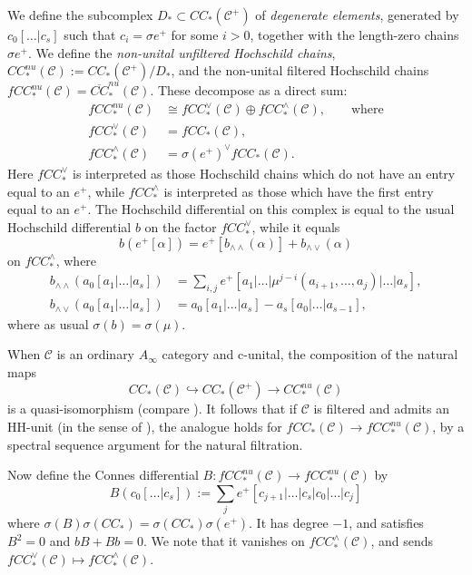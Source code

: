 \documentclass{article}
\def\cC{\mathcal{C}}
\begin{document}
We define the subcomplex $D_* \subset CC_*(\cC^+)$ of \emph{degenerate elements}, generated by $c_0[\ldots|c_s]$ such that $c_i = \sigma e^+$ for some $i>0$, together with the length-zero chains $\sigma e^+$. 
We define the \emph{non-unital unfiltered Hochschild chains}, $CC_*^{nu}(\cC) := CC_*(\cC^+)/D_*$, and the non-unital filtered Hochschild chains $fCC^{nu}_*(\cC) = \overline{CC}_*^{nu}(\cC)$. 
These decompose as a direct sum:
\begin{align*}
    fCC^{nu}_*(\cC) &\cong fCC^\vee_*(\cC) \oplus fCC^\wedge_*(\cC),\qquad\text{where}\\
    fCC^{\vee}_*(\cC) &= fCC_*(\cC),\\
    fCC^{\wedge}_*(\cC) &= \sigma(e^+)^\vee fCC_*(\cC).
\end{align*}
Here $fCC^{\vee}_*$ is interpreted as those Hochschild chains which do not have an entry equal to an $e^+$, while $fCC^{\wedge}_*$ is interpreted as those which have the first entry equal to an $e^+$. 
The Hochschild differential on this complex is equal to the usual Hochschild differential $b$ on the factor $fCC^{\vee}_*$, while it equals
$$b(e^+[\alpha]) = e^+[b_{\wedge\wedge}(\alpha)] + b_{\wedge \vee}(\alpha)$$
on $fCC^{\wedge}_*$, where
\begin{align}
\label{eq:b hat}
    b_{\wedge \wedge}(a_0[a_1|\ldots|a_s]) &=  \sum_{i,j} e^+[a_1|\ldots|\mu^{j-i}(a_{i+1},\ldots,a_j)|\ldots|a_s],\\
    b_{\wedge \vee}(a_0[a_1|\ldots|a_s]) &= a_0[a_1|\ldots|a_s] - a_s[a_0|\ldots|a_{s-1}],
\end{align}
where as usual $\sigma(b) = \sigma(\mu)$.

When $\cC$ is an ordinary $A_\infty$ category and c-unital, the composition of the natural maps
\[ CC_*(\cC) \hookrightarrow CC_*(\cC^+) \to CC_*^{nu}(\cC)\]
is a quasi-isomorphism (compare \cite[Section 1.4]{Loday_CH}). 
It follows that if $\cC$ is filtered and admits an HH-unit (in the sense of \cite[Definition 2.17]{relfukii}), the analogue holds for $fCC_*(\cC) \to fCC_*^{nu}(\cC)$, by a spectral sequence argument for the natural filtration. 

Now define the Connes differential $B: fCC_*^{nu}(\cC) \to fCC_*^{nu}(\cC)$ by
\begin{equation}
\label{eqn:ConnesB}
 B(c_0[\ldots|c_s]) := \sum_j e^+[c_{j+1}|\ldots|c_s|c_0|\ldots|c_j]
\end{equation}
where $\sigma(B)\sigma(CC_*) = \sigma(CC_*)\sigma(e^+)$.    
It has degree $-1$, and satisfies $B^2 = 0$ and $bB+Bb = 0$. 
We note that it vanishes on $fCC^{\wedge}_*(\cC)$, and sends $fCC^{\vee}_*(\cC) \mapsto fCC^{\wedge}_*(\cC)$. 
\end{document}
